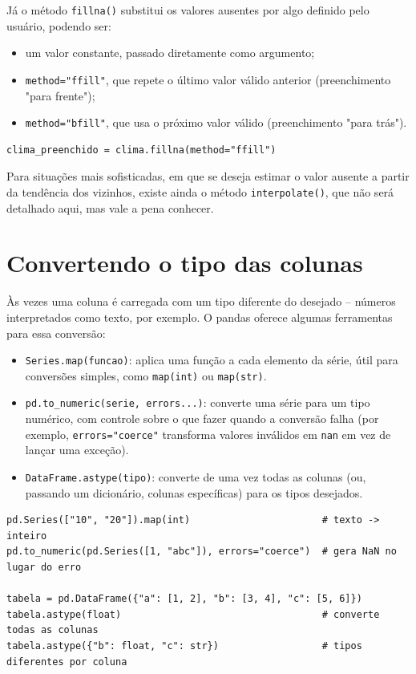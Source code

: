 \documentclass[11pt,a4paper]{article}
\begin{document}
Já o método \texttt{fillna()} substitui os valores ausentes por algo definido pelo usuário, podendo ser:
\begin{itemize}
    \item um valor constante, passado diretamente como argumento;
    \item \texttt{method="ffill"}, que repete o último valor válido anterior (preenchimento "para frente");
    \item \texttt{method="bfill"}, que usa o próximo valor válido (preenchimento "para trás").
\end{itemize}

\begin{lstlisting}
clima_preenchido = clima.fillna(method="ffill")
\end{lstlisting}

Para situações mais sofisticadas, em que se deseja estimar o valor ausente a partir da tendência dos vizinhos, existe ainda o método \texttt{interpolate()}, que não será detalhado aqui, mas vale a pena conhecer.

\section{Convertendo o tipo das colunas}

Às vezes uma coluna é carregada com um tipo diferente do desejado -- números interpretados como texto, por exemplo. O pandas oferece algumas ferramentas para essa conversão:
\begin{itemize}
    \item \texttt{Series.map(funcao)}: aplica uma função a cada elemento da série, útil para conversões simples, como \texttt{map(int)} ou \texttt{map(str)}.
    \item \texttt{pd.to\_numeric(serie, errors...)}: converte uma série para um tipo numérico, com controle sobre o que fazer quando a conversão falha (por exemplo, \texttt{errors="coerce"} transforma valores inválidos em \texttt{nan} em vez de lançar uma exceção).
    \item \texttt{DataFrame.astype(tipo)}: converte de uma vez todas as colunas (ou, passando um dicionário, colunas específicas) para os tipos desejados.
\end{itemize}

\begin{lstlisting}
pd.Series(["10", "20"]).map(int)                       # texto -> inteiro
pd.to_numeric(pd.Series([1, "abc"]), errors="coerce")  # gera NaN no lugar do erro

tabela = pd.DataFrame({"a": [1, 2], "b": [3, 4], "c": [5, 6]})
tabela.astype(float)                                   # converte todas as colunas
tabela.astype({"b": float, "c": str})                  # tipos diferentes por coluna
\end{lstlisting}
\end{document}
